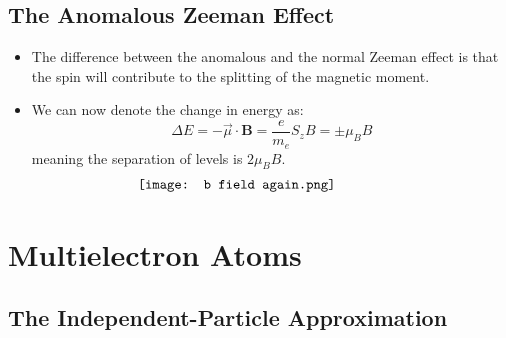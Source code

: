 \documentclass[12pt, letterpaper, twoside]{article}
\begin{document}
\subsection{The Anomalous Zeeman Effect}

\begin{itemize}
    \item The difference between the anomalous and the normal Zeeman effect is that the spin will contribute to the splitting of the magnetic moment.
    \item We can now denote the change in energy as:
    \begin{equation*}
        \Delta E = -\vec{\mu}\cdot \textbf{B} = \frac{e}{m_e}S_zB = \pm\mu_BB
    \end{equation*}
    meaning the separation of levels is $2\mu_BB$.
    \begin{align}
    \vcenter{\hbox{\texttt{[image: b field again.png]}}}
        &\qquad\qquad
        \vcenter{\hbox{\begin{minipage}{8cm}
        \end{minipage}}}
        & \notag
    \end{align}
\end{itemize}
\section{Multielectron Atoms}

\subsection{The Independent-Particle Approximation}
\end{document}
